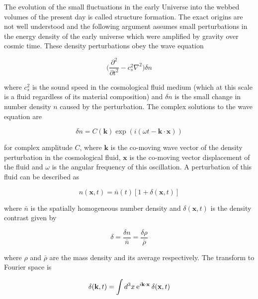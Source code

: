 \documentclass[twocolumn]{article}
\numberwithin{equation}{section}
\begin{document}

The evolution of the small fluctuations in the early Universe into the webbed volumes of the present day is called 
structure formation. The exact origins are not well understood and the following argument assumes small perturbations 
in the energy density of the early universe which were amplified by gravity over cosmic time. These density perturbations
obey the wave equation 

\begin{equation}
    \bigg ( \frac{\partial^2}{\partial t^2} - c_s^2\nabla^2\bigg )\delta n
\end{equation}

where $c_s^2$ is the sound speed in the cosmological fluid medium (which at this scale is a fluid regardless of its 
material composition) and $\delta n$ is the small change in number density $n$ caused by the perturbation. The complex
solutions to the wave equation are 

\begin{equation}
    \delta n = C(\mathbf{k})\exp(i(\omega t - \mathbf{k}\cdot\mathbf{x}))
\end{equation}

for complex amplitude $C$, where $\mathbf{k}$ is the co-moving wave vector of the density perturbation in the 
cosmological fluid, $\mathbf{x}$ is the co-moving vector displacement of the fluid and $\omega$ is the angular frequency
of this oscillation. A perturbation of this fluid can be described as

\begin{equation}
    n(\mathbf{x},t) = \bar{n}(t)[1+\delta(\mathbf{x},t)]
\end{equation}

where $\bar{n}$ is the spatially homogeneous number density and $\delta(\mathbf{x},t)$ is the density contrast given by

\begin{equation}
    \delta = \frac{\delta n}{\bar{n}}=\frac{\delta \rho}{\bar{\rho}}
\end{equation}

where $\rho$ and $\bar{\rho}$ are the mass density and its average respectively. The transform to Fourier space is 

\begin{equation}
    \delta(\mathbf{k}, t) = \int d^3x \: \textup{e}^{i\mathbf{k}\cdot\mathbf{x}} \: \delta(\mathbf{x},t)
\end{equation}
\end{document}
